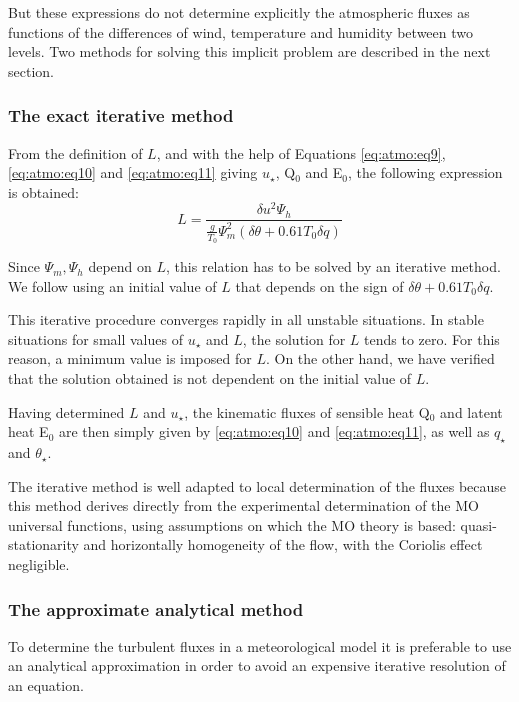 But these expressions do not determine explicitly the atmospheric fluxes as
functions of the differences of wind, temperature and humidity between two
levels. Two methods for solving this implicit problem are described in the
next section.

\subsubsection{The exact iterative method}

From the definition of $L$, and with the help of Equations \eqref{eq:atmo:eq9}, \eqref{eq:atmo:eq10} and
\eqref{eq:atmo:eq11} giving $u_\star $, Q$_{0}$ and E$_{0}$, the following
expression is obtained:
\begin{equation}
\label{eq:atmo:eq12}L=\frac{\delta u^{2} \Psi_{h}}{\frac{g}{T_{0}}\Psi_{m}^{2}(\delta {\theta}+0.61 T_{0} \delta {q})}
\end{equation}

Since $\Psi_{m}, \Psi_{h}$ depend on $L$, this
relation has to be solved by an iterative method. We follow \cite{Beljaars:1991}
using an initial value of $L$ that depends on the sign of
$\delta \theta +0.61 T_{0} \delta q$.

This iterative procedure converges rapidly in all unstable situations. In
stable situations for small values of $u_{\star}$ and $L$, the
solution for $L$ tends to zero. For this reason, a minimum value is imposed
for $L$. On the other hand, we have verified that the solution obtained is not
dependent on the initial value of $L$.

Having determined $L$ and $u_{\star}$, the kinematic
fluxes of sensible heat Q$_{0}$ and latent heat E$_{0}$ are then simply
given by \eqref{eq:atmo:eq10} and \eqref{eq:atmo:eq11}, as well as $q_{\star} $and
$\theta_{\star} $.

The iterative method is well adapted to local determination of the fluxes
because this method derives directly from the experimental determination of
the MO universal functions, using assumptions on which the MO theory is
based: quasi-stationarity and horizontally homogeneity of the flow, with the
Coriolis effect negligible.

\subsubsection{The approximate analytical method}
To determine the turbulent fluxes in a meteorological model it is preferable
to use an analytical approximation in order to avoid an expensive iterative
resolution of an equation.

